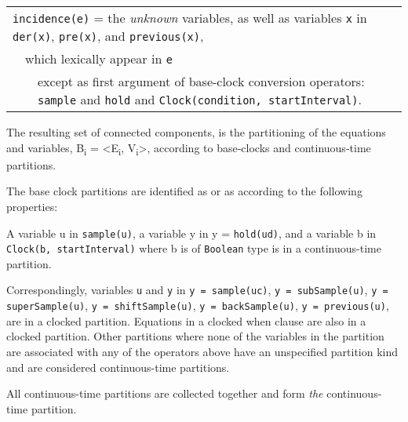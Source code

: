 \begin{tabular}{p{1cm}p{1cm}p{1cm}p{12cm}}
\multicolumn{4}{p{15cm}}{\lstinline!incidence(e)! = the \emph{unknown} variables, as well as
variables \lstinline!x! in \lstinline!der(x)!, \lstinline!pre(x)!, and \lstinline!previous(x)!,}\\
&\multicolumn{3}{p{14cm}}{which lexically appear in \lstinline!e!}\\
&&\multicolumn{2}{p{13cm}}{except as first argument of base-clock conversion operators: \lstinline!sample! and \lstinline!hold! and \lstinline!Clock(condition, startInterval)!.}
\end{tabular}

The resulting set of connected components, is the partitioning of the
equations and variables, B\textsubscript{i} =
\textless{}E\textsubscript{i}, V\textsubscript{i}\textgreater{},
according to base-clocks and continuous-time partitions.

The base clock partitions are identified as  or as  according to the following properties:

A variable u in \lstinline!sample(u)!, a variable y in y =
\lstinline!hold(ud)!, and a variable b in \lstinline!Clock(b, startInterval)! where b is of \lstinline!Boolean! type is in a continuous-time partition.

Correspondingly, variables \lstinline!u! and \lstinline!y! in
\lstinline!y = sample(uc)!,
\lstinline!y = subSample(u)!,
\lstinline!y = superSample(u)!,
\lstinline!y = shiftSample(u)!,
\lstinline!y = backSample(u)!,
\lstinline!y = previous(u)!, are in a clocked partition. Equations in a clocked
when clause are also in a clocked partition.
Other partitions where none of the variables in the partition are
associated with any of the operators above have an unspecified partition
kind and are considered continuous-time partitions.

All continuous-time partitions are collected together and form \emph{the} continuous-time partition.

